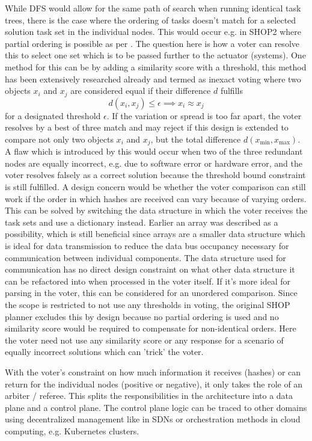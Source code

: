 While DFS would allow for the same path of search when running identical task trees, there is the case where the ordering of tasks doesn't match for a selected solution task set in the individual nodes. This would occur e.g. in SHOP2 where partial ordering is possible as per \cite{nau_shop2_2003}. The question here is how a voter can resolve this to select one set which is to be passed further to the actuator (systems). One method for this can be by adding a similarity score with a threshold, this method has been extensively researched already and termed as inexact voting \parencite{parhami_voting_1994} where two objects \(x_i\) and \(x_j\) are considered equal if their difference \(d\) fulfills
\[
d(x_i, x_j) \le \epsilon \implies x_i \approx x_j
\]
for a designated threshold \(\epsilon\). If the variation or spread is too far apart, the voter resolves by a best of three match and may reject if this design is extended to compare not only two objects \(x_i\) and \(x_j\), but the total difference \(d(x_{\min}, x_{\max})\). A flaw which is introduced by this would occur when two of the three redundant nodes are equally incorrect, e.g. due to software error or hardware error, and the voter resolves falsely as a correct solution because the threshold bound constraint is still fulfilled.
A design concern would be whether the voter comparison can still work if the order in which hashes are received can vary because of varying orders. This can be solved by switching the data structure in which the voter receives the task sets and use a dictionary instead. Earlier an array was described as a possibility, which is still beneficial since arrays are a smaller data structure which is ideal for data transmission to reduce the data bus occupancy necessary for communication between individual components.
The data structure used for communication has no direct design constraint on what other data structure it can be refactored into when processed in the voter itself. If it's more ideal for parsing in the voter, this can be considered for an unordered comparison.
Since the scope is restricted to not use any thresholds in voting, the original SHOP planner excludes this by design because no partial ordering is used and no similarity score would be required to compensate for non-identical orders. Here the voter need not use any similarity score or any response for a scenario of equally incorrect solutions which can 'trick' the voter.

With the voter's constraint on how much information it receives (hashes) or can return for the individual nodes (positive or negative), it only takes the role of an arbiter / referee. This splits the responsibilities in the architecture into a data plane and a control plane. The control plane logic can be traced to other domains using decentralized management like in SDNs or orchestration methods in cloud computing, e.g. Kubernetes clusters.

